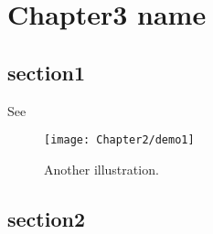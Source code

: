 
\chapter{Chapter3 name} %
\label{ch:doptim_netsys} %




\section{section1}\label{sec:top_opt_model}

 
 See 

\begin{figure}[!htbp]
  \centering
    \texttt{[image: Chapter2/demo1]}
  \caption{Another illustration.}
  \label{fig:demo2}
\end{figure}


\section{section2}\label{sec:canonical_dopt}

